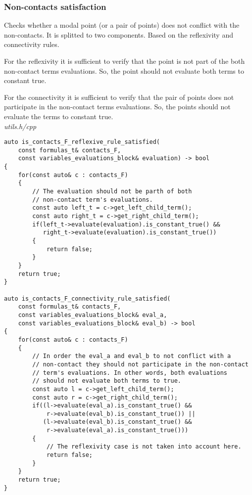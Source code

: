 \documentclass{article}
\begin{document}
	\newpage
	\subsubsection*{Non-contacts satisfaction}
	Checks whether a modal point (or a pair of points) does not conflict with the non-contacts. It is splitted to two components. Based on the reflexivity and connectivity rules.

	For the reflexivity it is sufficient to verify that the point is not part of the both non-contact terms evaluations. So, the point should not evaluate both terms to constant true.

	For the connectivity it is sufficient to verify that the pair of points does not participate in the non-contact terms evaluations. So, the points should not evaluate the terms to constant true.
\\
\noindent
\textit{utils.h/cpp}
\begin{lstlisting}
auto is_contacts_F_reflexive_rule_satisfied(
	const formulas_t& contacts_F,
	const variables_evaluations_block& evaluation) -> bool
{
    for(const auto& c : contacts_F)
    {
        // The evaluation should not be parth of both
        // non-contact term's evaluations.
        const auto left_t = c->get_left_child_term();
        const auto right_t = c->get_right_child_term();
        if(left_t->evaluate(evaluation).is_constant_true() &&
           right_t->evaluate(evaluation).is_constant_true())
        {
            return false;
        }
    }
    return true;
}

auto is_contacts_F_connectivity_rule_satisfied(
	const formulas_t& contacts_F,
	const variables_evaluations_block& eval_a,
	const variables_evaluations_block& eval_b) -> bool
{
    for(const auto& c : contacts_F)
    {
        // In order the eval_a and eval_b to not conflict with a
        // non-contact they should not participate in the non-contact
        // term's evaluations. In other words, both evaluations
        // should not evaluate both terms to true.
        const auto l = c->get_left_child_term();
        const auto r = c->get_right_child_term();
        if((l->evaluate(eval_a).is_constant_true() &&
            r->evaluate(eval_b).is_constant_true()) ||
           (l->evaluate(eval_b).is_constant_true() &&
            r->evaluate(eval_a).is_constant_true()))
        {
            // The reflexivity case is not taken into account here.
            return false;
        }
    }
    return true;
}

\end{lstlisting}
\end{document}
